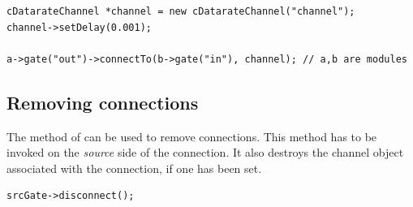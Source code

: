 \begin{verbatim}
cDatarateChannel *channel = new cDatarateChannel("channel");
channel->setDelay(0.001);

a->gate("out")->connectTo(b->gate("in"), channel); // a,b are modules
\end{verbatim}


\subsection{Removing connections}

The  method of  can be
used to remove connections. This method has to be invoked
on the \textit{source} side of the connection. It also destroys
the channel object associated with the connection, if one has been set.

\begin{verbatim}
srcGate->disconnect();
\end{verbatim}


